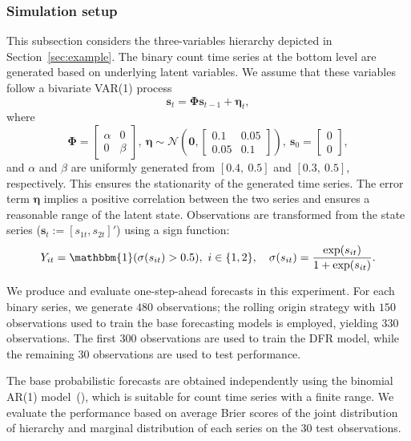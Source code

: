 \documentclass[a4paper,review,12pt,authoryear]{elsarticle}
\theoremstyle{definition}
\begin{document}
    \subsubsection{Simulation setup}
    This subsection considers the three-variables hierarchy depicted in Section~\ref{sec:example}.
    The binary count time series at the bottom level are generated based on underlying latent variables.
    We assume that these variables follow a bivariate VAR(1) process
    \[\mathbf{s}_t = \mathbf{\Phi}\mathbf{s}_{t-1}+\boldsymbol{\eta}_t,\]
    where
    \[
      \mathbf{\Phi} = \left[\begin{matrix}
        \alpha & 0 \\
        0 & \beta
      \end{matrix}\right], ~ \boldsymbol{\eta} \sim \mathcal{N}\left(\mathbf{0}, \left[\begin{matrix}
        0.1 & 0.05 \\
        0.05 & 0.1
      \end{matrix}\right]\right), ~ \mathbf{s}_{0} = \left[
        \begin{matrix}0 \\ 0\end{matrix}
      \right],
    \]
    and $\alpha$ and $\beta$ are uniformly generated from $[0.4, ~ 0.5]$ and $[0.3, ~ 0.5]$, respectively.
    This ensures the stationarity of the generated time series.
    The error term $\boldsymbol{\eta}$ implies a positive correlation between the two series and ensures a reasonable range of the latent state.
    Observations are transformed from the state series ($\mathbf{s}_{t} := [s_{1t}, s_{2t}]'$) using a sign function:
    \[
        Y_{it} = \mathbbm{1}(\sigma(s_{it}) > 0.5), ~ i\in\{1, 2\},\quad \sigma(s_{it}) = \frac{\exp(s_{it})}{1+\exp(s_{it})}.
    \]

    We produce and evaluate one-step-ahead forecasts in this experiment.
    For each binary series, we generate $480$ observations; the rolling origin strategy with $150$ observations used to train the base forecasting models is employed, yielding $330$ observations.
    The first $300$ observations are used to train the DFR model, while the remaining $30$ observations are used to test performance.

    The base probabilistic forecasts are obtained independently using the binomial AR(1) model~(\citealp{weissParameterEstimationBinomial2013}), which is suitable for count time series with a finite range.
    We evaluate the performance based on average Brier scores of the joint distribution of hierarchy and marginal distribution of each series on the $30$ test observations.
\end{document}
